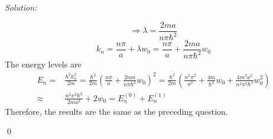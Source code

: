\documentclass[10pt,a4paper]{article}
\newenvironment{sol}
    {\emph{Solution:}
    }
    {
    \qed
    }
\begin{document}
\begin{sol}
\begin{itemize}
\begin{equation}
\Longrightarrow\lambda=\frac{2ma}{n\pi\hbar^2}
\end{equation}
\begin{equation}
k_n=\frac{n\pi}{a}+\lambda w_0=\frac{n\pi}{a}+\frac{2ma}{n\pi\hbar^2}w_0
\end{equation}
The energy levels are
\begin{align}
\nonumber E_n=&\frac{\hbar^2k_n^2}{2m}=\frac{\hbar^2}{2m}\left(\frac{n\pi}{a}+\frac{2ma}{n\pi\hbar^2}w_0\right)^2=\frac{\hbar^2}{2m}\left(\frac{n^2\pi^2}{a^2}+\frac{4m}{\hbar^2}w_0+\frac{4m^2a^2}{n^2\pi^2\hbar^4}w_0^2\right)\\
\approx&\frac{n^2\pi^2\hbar^2}{2ma^2}+2w_0=E_n^{(0)}+E_n^{(1)}
\end{align}
Therefore, the results are the same as the preceding question.
\end{itemize}
\end{sol}
\end{document}
